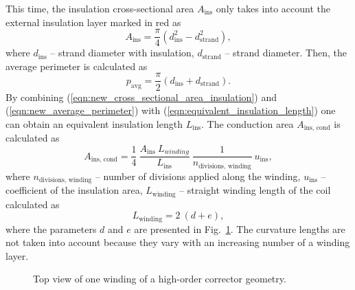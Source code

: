 This time, the insulation cross-sectional area $A_\text{ins}$ only takes into account the external insulation layer marked in red as
\begin{equation}
    A_\text{ins} = \frac{\pi}{4} \left( d^2_\text{ins} - d^2_\text{strand} \right),
    \label{eqn:new_cross_sectional_area_insulation}
\end{equation}
where $d_\text{ins}$ -- strand diameter with insulation, $d_\text{strand}$ -- strand diameter. Then, the average perimeter is calculated as
\begin{equation}
    p_\text{avg} =  \frac{\pi}{2} \left( d_\text{ins} + d_\text{strand} \right).
    \label{eqn:new_average_perimeter}
\end{equation}
By combining (\ref{eqn:new_cross_sectional_area_insulation}) and (\ref{eqn:new_average_perimeter}) with (\ref{eqn:equivalent_insulation_length}) one can obtain an equivalent insulation length $L_\text{ins}$. The conduction area $A_\text{ins, cond}$ is calculated as 
\begin{equation}
    A_\text{ins, cond} = \frac{1}{4}~\frac{ A_\text{ins} ~ L_{winding}}{L_\text{ins}}~\frac{1}{n_\text{divisions, winding}}~u_\text{ins},
    \label{eqn:new_equivalent_insulation_element_area}
\end{equation}
where $n_\text{divisions, winding}$ -- number of divisions applied along the winding, $u_\text{ins}$ -- coefficient of the insulation area, $L_\text{winding}$ -- straight winding length of the coil calculated as
\begin{equation}
    L_\text{winding} = 2~(d+e),
\end{equation}
where the parameters $d$ and $e$ are presented in Fig.~\ref{fig: winding_length_in_skew_quad}. The curvature lengths are not taken into account because they vary with an increasing number of a winding layer.

\begin{figure}[H]
    \centering
    \caption{Top view of one winding of a high-order corrector geometry.}
    \label{fig: winding_length_in_skew_quad}
\end{figure}

